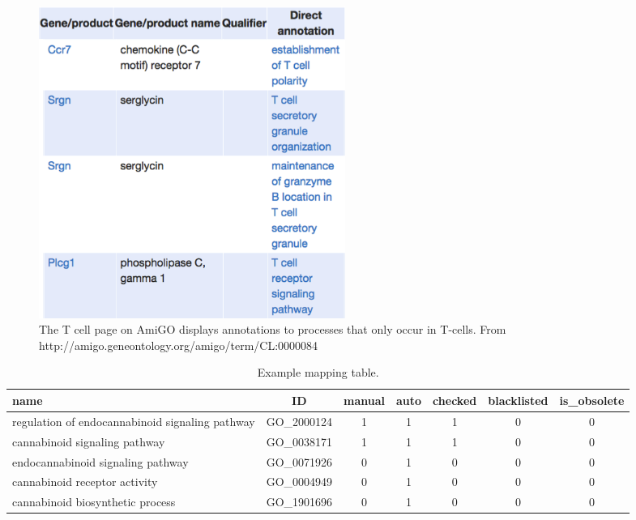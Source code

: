 \documentclass[runningheads,a4paper]{llncs}
\begin{document}
{{{\begin{figure}
\centering
\includegraphics[width=100mm]{amigo.png}
\caption{  The  T cell page on AmiGO displays annotations to processes that only occur in T-cells.  From http://amigo.geneontology.org/amigo/term/CL:0000084}
\label{fig:amigo}
\end{figure}


\begin{table}
 \caption{Example mapping table.}
      \label{tab:mapping}
      \begin{tabular} {| p{4cm} |  c |  c |  c |  c |  c  | c |}
        \hline
        \textbf{name}&\textbf{ID}&\textbf{manual}&\textbf{auto}&\textbf{checked}&\textbf{blacklisted}&\textbf{is\_obsolete} \\ \hline 
        regulation of endocannabinoid signaling pathway&GO\_2000124&1&1&1&0&0 \\ \hline
        cannabinoid signaling pathway&GO\_0038171&1&1&1&0&0 \\ \hline
        endocannabinoid signaling pathway&GO\_0071926&0&1&0&0&0 \\ \hline
        cannabinoid receptor activity&GO\_0004949&0&1&0&0&0 \\ \hline
        cannabinoid biosynthetic process&GO\_1901696&0&1&0&0&0 \\ \hline
        \end{tabular}
 \end{table}


}}}
\end{document}
